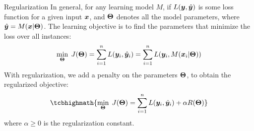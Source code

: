 \begin{frame}{Regularization}
%
In general, for any learning model $M$, if $L({\boldsymbol y}, \hat{{\boldsymbol y}})$ is some loss
function for a given input ${\boldsymbol x}$, and ${\bm \Theta}$ denotes all the model
parameters, where $\hat{{\boldsymbol y}} = M({\boldsymbol x} | {\bm \Theta})$.
The learning objective is to find the parameters that
minimize the loss over all instances:
\begin{align*}
    \min_{{\bm \Theta}} \; J({\bm \Theta}) =  
   \sum_{i=1}^n L({\boldsymbol y}_i, \hat{{\boldsymbol y}}_i) = 
    \sum_{i=1}^n L({\boldsymbol y}_i, M({\boldsymbol x}_i|{\bm \Theta}))
\end{align*}
With regularization, we add a penalty on the parameters ${\bm \Theta}$, to
obtain the regularized objective:
\begin{align}
    \tcbhighmath{
    \min_{\bTheta} \; J(\bTheta) = 
\sum_{i=1}^n L(\by_i, \hby_i) + \alpha R(\bTheta)}
\end{align}
where $\alpha \ge 0$ is the regularization constant.
\end{frame}

